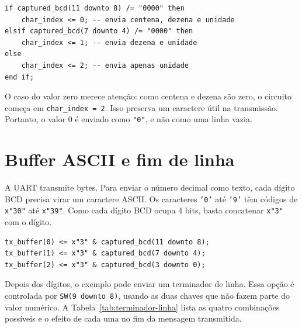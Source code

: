 \documentclass[12pt,a4paper]{book}
\begin{document}
\begin{lstlisting}[caption={Escolha do primeiro dígito transmitido.}]
if captured_bcd(11 downto 8) /= "0000" then
    char_index <= 0; -- envia centena, dezena e unidade
elsif captured_bcd(7 downto 4) /= "0000" then
    char_index <= 1; -- envia dezena e unidade
else
    char_index <= 2; -- envia apenas unidade
end if;
\end{lstlisting}

O caso do valor zero merece atenção: como centena e dezena são zero, o circuito começa em \texttt{char\_index = 2}. Isso preserva um caractere útil na transmissão. Portanto, o valor 0 é enviado como \texttt{"0"}, e não como uma linha vazia.

\section{Buffer ASCII e fim de linha}

A UART transmite bytes. Para enviar o número decimal como texto, cada dígito BCD precisa virar um caractere ASCII. Os caracteres \texttt{'0'} até \texttt{'9'} têm códigos de \texttt{x"30"} até \texttt{x"39"}. Como cada dígito BCD ocupa 4 bits, basta concatenar \texttt{x"3"} com o dígito.

\begin{lstlisting}[caption={Montagem dos dígitos decimais como caracteres ASCII.}]
tx_buffer(0) <= x"3" & captured_bcd(11 downto 8);
tx_buffer(1) <= x"3" & captured_bcd(7 downto 4);
tx_buffer(2) <= x"3" & captured_bcd(3 downto 0);
\end{lstlisting}

Depois dos dígitos, o exemplo pode enviar um terminador de linha. Essa opção é controlada por \texttt{SW(9 downto 8)}, usando as duas chaves que não fazem parte do valor numérico. A Tabela~\ref{tab:terminador-linha} lista as quatro combinações possíveis e o efeito de cada uma no fim da mensagem transmitida.

\begin{table}[h]
\centering
{}
\caption{Seleção do terminador de linha.}
\label{tab:terminador-linha}
\end{table}
\end{document}
